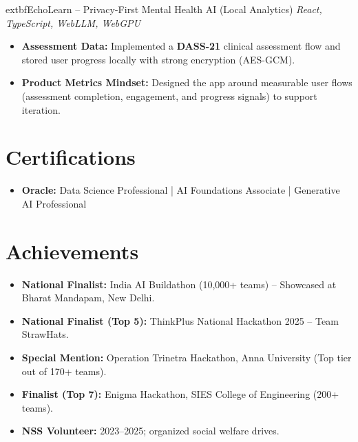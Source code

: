 \documentclass[10pt,a4paper]{article}
\begin{document}
	extbf{EchoLearn – Privacy-First Mental Health AI (Local Analytics)} \hfill \textit{React, TypeScript, WebLLM, WebGPU}
\begin{itemize}[leftmargin=*, nosep]
    \item \textbf{Assessment Data:} Implemented a \textbf{DASS-21} clinical assessment flow and stored user progress locally with strong encryption (AES-GCM).
    \item \textbf{Product Metrics Mindset:} Designed the app around measurable user flows (assessment completion, engagement, and progress signals) to support iteration.
\end{itemize}

\section{Certifications}
\begin{itemize}[leftmargin=*, nosep]
    \item \textbf{Oracle:} Data Science Professional | AI Foundations Associate | Generative AI Professional
\end{itemize}

\section{Achievements}
{\small
\begin{itemize}[leftmargin=*, nosep]
    \item \textbf{National Finalist:} India AI Buildathon (10,000+ teams) -- Showcased at Bharat Mandapam, New Delhi.
    \item \textbf{National Finalist (Top 5):} ThinkPlus National Hackathon 2025 -- Team StrawHats.
    \item \textbf{Special Mention:} Operation Trinetra Hackathon, Anna University (Top tier out of 170+ teams).
    \item \textbf{Finalist (Top 7):} Enigma Hackathon, SIES College of Engineering (200+ teams).
    \item \textbf{NSS Volunteer:} 2023--2025; organized social welfare drives.
\end{itemize}
}
\end{document}
